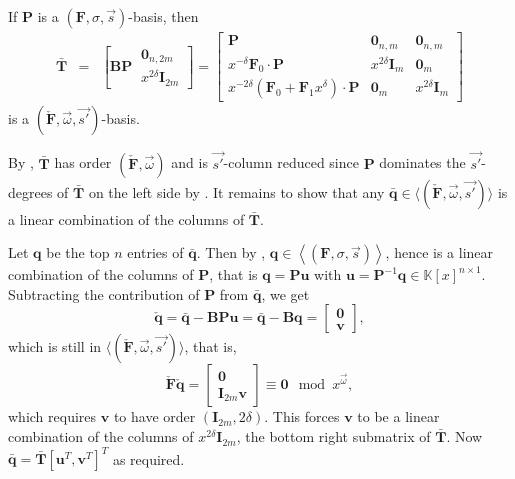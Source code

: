 \begin{lem}
\label{lem:FtoAbasis}If $\mathbf{P}$ is a $\left(\mathbf{F},\sigma,\vec{s}\right)$-basis,
then \begin{eqnarray*}
\bar{\mathbf{T}} & = & \left[\mathbf{B}\mathbf{P}~\begin{array}{|c}
\mathbf{0}_{n,2m}\\
x^{2\delta}\mathbf{I}_{2m}\end{array}\right]=\left[\begin{array}{r|cc}
\mathbf{P} & \mathbf{0}_{n,m} & \mathbf{0}_{n,m}\\
\hline x^{-\delta}\mathbf{F}_{0}\cdot\mathbf{P} & x^{2\delta}\mathbf{I}_{m} & \mathbf{0}_{m}\\
x^{-2\delta}\left(\mathbf{F}_{0}+\mathbf{F}_{1}x^{\delta}\right)\cdot\mathbf{P} & \mathbf{0}_{m} & x^{2\delta}\mathbf{I}_{m}\end{array}\right]\end{eqnarray*}
 is a $(\check{\mathbf{F}},\vec{\omega},\vec{s'})$-basis.\end{lem}
\begin{pf}
By , $\bar{\mathbf{T}}$ has order $(\check{\mathbf{F}},\vec{\omega})$
and is $\vec{s'}$-column reduced since $\mathbf{P}$ dominates the
$\vec{s'}$-degrees of $\bar{\mathbf{T}}$ on the left side by .
It remains to show that any $\bar{\mathbf{q}}\in\langle(\check{\mathbf{F}},\vec{\omega},\vec{s'})\rangle$
is a linear combination of the columns of $\mathbf{\bar{\mathbf{T}}}$.

Let $\mathbf{q}$ be the top $n$ entries of $\bar{\mathbf{q}}$.
Then by , $\mathbf{q}\in\left\langle \left(\mathbf{F},\sigma,\vec{s}\right)\right\rangle $,
hence is a linear combination of the columns of $\mathbf{P}$, that
is $\mathbf{q}=\mathbf{P}\mathbf{u}$ with $\mathbf{u}=\mathbf{P}^{-1}\mathbf{q}\in\mathbb{K}\left[x\right]^{n\times1}$.
Subtracting the contribution of $\mathbf{P}$ from $\bar{\mathbf{q}}$,
we get \[
\check{\mathbf{q}}=\bar{\mathbf{q}}-\mathbf{B}\mathbf{P}\mathbf{u}=\bar{\mathbf{q}}-\mathbf{B}\mathbf{q}=\left[\begin{array}{c}
\mathbf{0}\\
\mathbf{v}\end{array}\right],\]
 which is still in $\langle(\check{\mathbf{F}},\vec{\omega},\vec{s'})\rangle$,
that is, \[
\check{\mathbf{F}}\check{\mathbf{q}}=\begin{bmatrix}\mathbf{0}\\
\mathbf{I}_{2m}\mathbf{v}\end{bmatrix}\equiv\mathbf{0}\mod x^{\vec{\omega}},\]
 which requires $\mathbf{v}$ to have order $\left(\mathbf{I}_{2m},2\delta\right)$.
This forces $\mathbf{v}$ to be a linear combination of the columns
of $x^{2\delta}\mathbf{I}_{2m}$, the bottom right submatrix of $\bar{\mathbf{T}}$.
Now $\bar{\mathbf{q}}=\bar{\mathbf{T}}\left[\mathbf{u}^{T},\mathbf{v}^{T}\right]^{T}$
as required.\end{pf}
